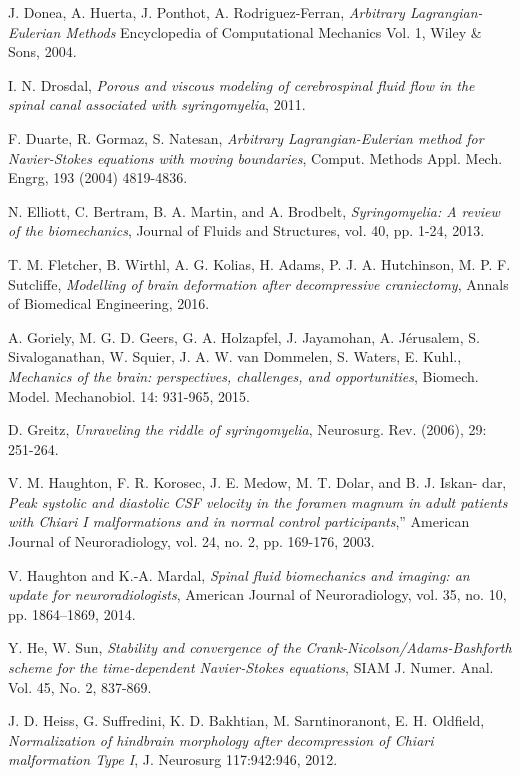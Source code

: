\documentclass[a4paper,11pt,oneside]{book}
\begin{document}
\begin{thebibliography}{100}
 J. Donea, A. Huerta, J. Ponthot, A. Rodriguez-Ferran, \emph{Arbitrary Lagrangian-Eulerian Methods} Encyclopedia of Computational Mechanics Vol. 1, Wiley \& Sons, 2004.

 I. N. Drosdal, \emph{Porous and viscous modeling of cerebrospinal fluid flow in the spinal canal associated with syringomyelia}, 2011.

 F. Duarte, R. Gormaz, S. Natesan, \emph{Arbitrary Lagrangian-Eulerian method for Navier-Stokes equations with moving boundaries}, Comput. Methods Appl. Mech. Engrg, 193 (2004) 4819-4836.

 N. Elliott, C. Bertram, B. A. Martin, and A. Brodbelt, \emph{Syringomyelia: A review of the biomechanics}, Journal of Fluids and Structures, vol. 40, pp. 1-24, 2013.


 T. M. Fletcher, B. Wirthl, A. G. Kolias, H. Adams, P. J. A. Hutchinson, M. P. F. Sutcliffe, \emph{Modelling of brain deformation after decompressive craniectomy}, Annals of Biomedical Engineering, 2016.

 A. Goriely, M. G. D. Geers, G. A. Holzapfel, J. Jayamohan, A. Jérusalem, S. Sivaloganathan, W. Squier, J. A. W. van Dommelen, S. Waters, E. Kuhl., \emph{Mechanics of the brain: perspectives, challenges, and opportunities}, Biomech. Model. Mechanobiol. 14: 931-965, 2015.


 D. Greitz, \emph{Unraveling the riddle of syringomyelia}, Neurosurg. Rev. (2006), 29: 251-264.

 V. M. Haughton, F. R. Korosec, J. E. Medow, M. T. Dolar, and B. J. Iskan- dar, \emph{Peak systolic and diastolic CSF velocity in the foramen magnum in adult patients with Chiari I malformations and in normal control participants},” American Journal of Neuroradiology, vol. 24, no. 2, pp. 169-176, 2003.

 V. Haughton and K.-A. Mardal, \emph{Spinal fluid biomechanics and imaging: an update for neuroradiologists}, American Journal of Neuroradiology, vol. 35, no. 10, pp. 1864–1869, 2014.


 Y. He, W. Sun, \emph{Stability and convergence of the Crank-Nicolson/Adams-Bashforth scheme for the time-dependent Navier-Stokes equations}, SIAM J. Numer. Anal. Vol. 45, No. 2, 837-869.

 J. D. Heiss, G. Suffredini, K. D. Bakhtian, M. Sarntinoranont, E. H. Oldfield, \emph{Normalization of hindbrain morphology after decompression of Chiari malformation Type I}, J. Neurosurg 117:942:946, 2012.



\end{thebibliography}
\end{document}
